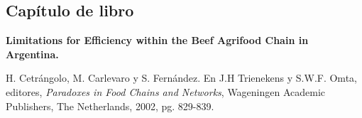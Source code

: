 \subsection{Capítulo de libro}
\textbf{Limitations for Efficiency within the Beef Agrifood Chain in Argentina.}
 
 H. Cetrángolo, M. Carlevaro y S. Fernández. En J.H Trienekens y S.W.F. Omta, editores,  \textit{Paradoxes in Food Chains and Networks}, Wageningen Academic Publishers, The Netherlands, 2002, pg. 829-839.
 
